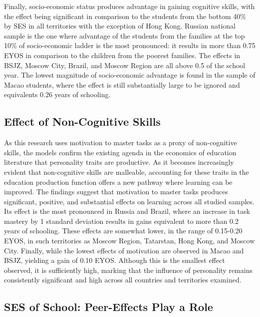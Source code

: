 \documentclass[
]{article}
\begin{document}
Finally, socio-economic status produces advantage in gaining cognitive
skills, with the effect being significant in comparison to the students
from the bottom 40\% by SES in all territories with the exception of
Hong Kong. Russian national sample is the one where advantage of the
students from the families at the top 10\% of socio-economic ladder is
the most pronounced: it results in more than 0.75 EYOS in comparison to
the children from the poorest families. The effects in BSJZ, Moscow
City, Brazil, and Moscow Region are all above 0.5 of the school year.
The lowest magnitude of socio-economic advantage is found in the sample
of Macao students, where the effect is still substantially large to be
ignored and equivalents 0.26 years of schooling.

\subsection{Effect of Non-Cognitive
Skills}\label{effect-of-non-cognitive-skills}

As this research uses motivation to master tasks as a proxy of
non-cognitive skills, the models confirm the existing agenda in the
economics of education literature that personality traits are
productive. As it becomes increasingly evident that non-cognitive skills
are malleable, accounting for these traits in the education production
function offers a new pathway where learning can be improved. The
findings suggest that motivation to master tasks produces significant,
positive, and substantial effects on learning across all studied
samples. Its effect is the most pronounced in Russia and Brazil, where
an increase in task mastery by 1 standard deviation results in gains
equivalent to more than 0.2 years of schooling. These effects are
somewhat lower, in the range of 0.15-0.20 EYOS, in such territories as
Moscow Region, Tatarstan, Hong Kong, and Moscow City. Finally, while the
lowest effects of motivation are observed in Macao and BSJZ, yielding a
gain of 0.10 EYOS. Although this is the smallest effect observed, it is
sufficiently high, marking that the influence of personality remains
consistently significant and high across all countries and territories
examined.

\subsection{SES of School: Peer-Effects Play a
Role}\label{ses-of-school-peer-effects-play-a-role}
\end{document}
